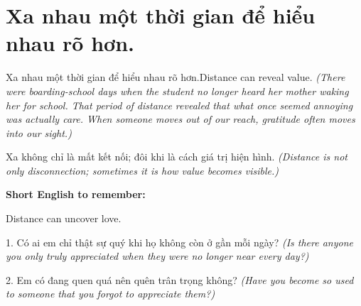 \section{Xa nhau một thời gian để hiểu nhau rõ hơn.}
\begin{truyen}{Xa nhau một thời gian để hiểu nhau rõ hơn.}{Distance can reveal value.}
\textit{(There were boarding-school days when the student no longer heard her mother waking her for school. That period of distance revealed that what once seemed annoying was actually care. When someone moves out of our reach, gratitude often moves into our sight.)}
\end{truyen}
\begin{baihoc}
Xa không chỉ là mất kết nối; đôi khi là cách giá trị hiện hình.
\textit{(Distance is not only disconnection; sometimes it is how value becomes visible.)}
\end{baihoc}
\begin{ghinhoanh}
\textbf{Short English to remember:}

Distance can uncover love.
\end{ghinhoanh}
\begin{tuhocnhanh}
1. Có ai em chỉ thật sự quý khi họ không còn ở gần mỗi ngày? \textit{(Is there anyone you only truly appreciated when they were no longer near every day?)}

2. Em có đang quen quá nên quên trân trọng không? \textit{(Have you become so used to someone that you forgot to appreciate them?)}
\end{tuhocnhanh}
\ngancach

